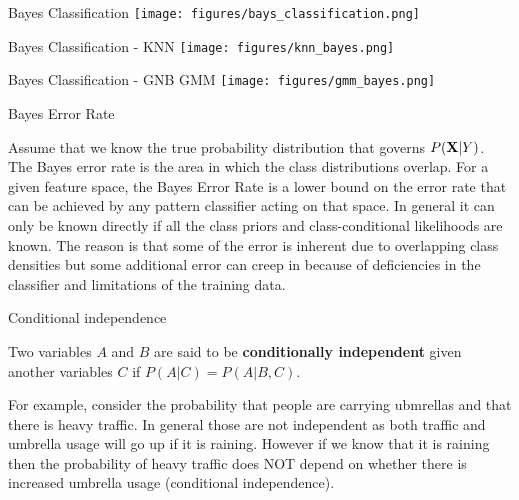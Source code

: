 \documentclass[12pt]{beamer}
\begin{document}
\begin{frame}{Bayes Classification} 
 \texttt{[image: figures/bays\_classification.png]}
\end{frame} 

\begin{frame}{Bayes Classification - KNN} 
 \texttt{[image: figures/knn\_bayes.png]}
\end{frame} 

\begin{frame}{Bayes Classification - GNB GMM} 
 \texttt{[image: figures/gmm\_bayes.png]}
\end{frame} 

\begin{frame}{Bayes Error Rate}
\begin{definition} 

Assume that we know the true probability distribution that governs
$P({\bf X}| Y)$. The Bayes error rate is the area in which the class
distributions overlap. For a given feature space, the Bayes Error Rate
is a lower bound on the error rate that can be achieved by any pattern
classifier acting on that space. In general it can only be known
directly if all the class priors and class-conditional likelihoods are
known. The reason is that some of the error is inherent due to
overlapping class densities but some additional error can creep in
because of deficiencies in the classifier and limitations of the
training data.

\end{definition}
\end{frame} 



\begin{frame}{Conditional independence} 
\begin{definition} 
Two variables $A$ and $B$ are said to be {\bf conditionally independent} given 
another variables $C$ if $P(A|C) = P(A|B,C)$. 
\end{definition} 


For example, consider the probability that people are carrying
ubmrellas and that there is heavy traffic. In general those are not
independent as both traffic and umbrella usage will go up if it is
raining. However if we know that it is raining then the probability of
heavy traffic does NOT depend on whether there is increased umbrella
usage (conditional independence).


\end{frame} 
\end{document}
